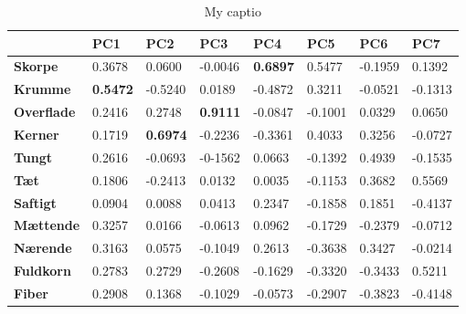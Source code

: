 
\begin{table}[H]
\centering
\begin{tabular}{llllllll}
\hline
\textbf{}                               & \textbf{PC1}    & \textbf{PC2}    & \textbf{PC3}    & \textbf{PC4}    & \textbf{PC5} & \textbf{PC6} & \textbf{PC7} \\ \hline
\multicolumn{1}{l|}{\textbf{Skorpe}}    & 0.3678          & 0.0600          & -0.0046         & \textbf{0.6897} & 0.5477       & -0.1959      & 0.1392       \\
\multicolumn{1}{l|}{\textbf{Krumme}}    & \textbf{0.5472} & -0.5240         & 0.0189          & -0.4872         & 0.3211       & -0.0521      & -0.1313      \\
\multicolumn{1}{l|}{\textbf{Overflade}} & 0.2416          & 0.2748          & \textbf{0.9111} & -0.0847         & -0.1001      & 0.0329       & 0.0650       \\
\multicolumn{1}{l|}{\textbf{Kerner}}    & 0.1719          & \textbf{0.6974} & -0.2236         & -0.3361         & 0.4033       & 0.3256       & -0.0727      \\
\multicolumn{1}{l|}{\textbf{Tungt}}     & 0.2616          & -0.0693         & -0-1562         & 0.0663          & -0.1392      & 0.4939       & -0.1535      \\
\multicolumn{1}{l|}{\textbf{Tæt}}       & 0.1806          & -0.2413         & 0.0132          & 0.0035          & -0.1153      & 0.3682       & 0.5569       \\
\multicolumn{1}{l|}{\textbf{Saftigt}}   & 0.0904          & 0.0088          & 0.0413          & 0.2347          & -0.1858      & 0.1851       & -0.4137      \\
\multicolumn{1}{l|}{\textbf{Mættende}}  & 0.3257          & 0.0166          & -0.0613         & 0.0962          & -0.1729      & -0.2379      & -0.0712      \\
\multicolumn{1}{l|}{\textbf{Nærende}}   & 0.3163          & 0.0575          & -0.1049         & 0.2613          & -0.3638      & 0.3427       & -0.0214      \\
\multicolumn{1}{l|}{\textbf{Fuldkorn}}  & 0.2783          & 0.2729          & -0.2608         & -0.1629         & -0.3320      & -0.3433      & 0.5211       \\
\multicolumn{1}{l|}{\textbf{Fiber}}     & 0.2908          & 0.1368          & -0.1029         & -0.0573         & -0.2907      & -0.3823      & -0.4148     
\end{tabular}
\caption{My captio}
\label{tab:loadings}
\end{table}

